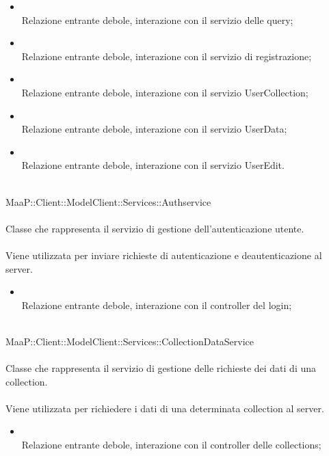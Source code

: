 \begin{itemize}
\item{}\\
Relazione entrante debole, interazione con il servizio delle query;
\item{}\\
Relazione entrante debole, interazione con il servizio di registrazione;
\item{}\\
Relazione entrante debole, interazione con il servizio UserCollection;
\item{}\\
Relazione entrante debole, interazione con il servizio UserData;
\item{}\\
Relazione entrante debole, interazione con il servizio UserEdit.
\end{itemize}

\\
MaaP::Client::ModelClient::Services::Authservice\\
\\
Classe che rappresenta il servizio di gestione dell'autenticazione utente.\\
\\
Viene utilizzata per inviare richieste di autenticazione e deautenticazione al server.\\
\begin{itemize}
\item{}\\
Relazione entrante debole, interazione con il controller del login;
\end{itemize}

\\
MaaP::Client::ModelClient::Services::CollectionDataService\\
\\
Classe che rappresenta il servizio di gestione delle richieste dei dati di una collection.\\
\\
Viene utilizzata per richiedere i dati di una determinata collection al server.\\
\begin{itemize}
\item{}\\
Relazione entrante debole, interazione con il controller delle collections;
\end{itemize}

